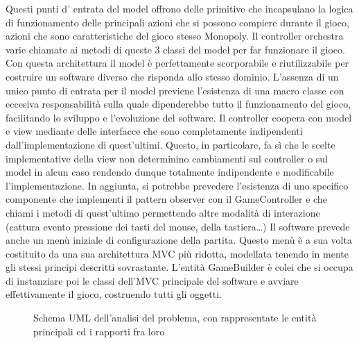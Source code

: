 Questi punti d’ entrata del model offrono delle primitive che incapsulano la logica di funzionamento 
delle principali azioni che si possono compiere durante il gioco, azioni che sono caratteristiche del 
gioco stesso Monopoly. Il controller orchestra varie chiamate ai metodi di queste 3 classi del model per far funzionare
il gioco.
Con questa architettura il model è perfettamente scorporabile e riutilizzabile per costruire 
un software diverso che risponda allo stesso dominio. L'assenza di un unico punto di entrata per il model
previene l'esistenza di una macro classe con eccesiva responsabilità sulla quale dipenderebbe tutto il funzionamento
del gioco, facilitando lo sviluppo e l'evoluzione del software.\newline
Il controller coopera con model e view mediante delle interfacce che sono completamente indipendenti 
dall’implementazione di quest’ultimi. 
Questo, in particolare, fa sì che le scelte implementative della view non determinino cambiamenti sul 
controller o sul model in alcun caso rendendo dunque totalmente
indipendente e modificabile l'implementazione.
In aggiunta, si potrebbe prevedere l'esistenza di uno specifico componente che implementi il pattern observer con il GameController
e che chiami i metodi di quest'ultimo permettendo altre modalità di interazione (cattura evento pressione dei tasti del mouse, della tastiera\dots)
Il software prevede anche un menù iniziale di configurazione della partita. 
Questo menù è a sua volta costituito da una sua architettura MVC più ridotta, 
modellata tenendo in mente gli stessi principi descritti sovrastante. 
L’entità GameBuilder è colei che si occupa di instanziare poi le classi dell’MVC principale del software e avviare effettivamente il gioco,
costruendo tutti gli oggetti.

\begin{figure}[H]
    \centering
    \caption{Schema UML dell'analisi del problema, con rappresentate le entità principali ed i rapporti fra loro}
	\label{img:entity_diagram}
\end{figure}
